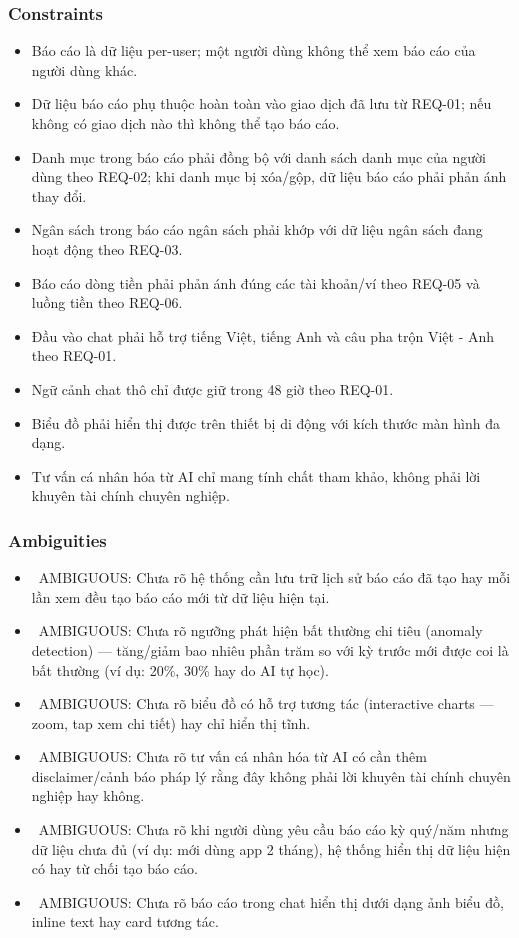 \subsubsection{Constraints}

\begin{itemize}
\item Báo cáo là dữ liệu per-user; một người dùng không thể xem báo cáo của người dùng khác.
\item Dữ liệu báo cáo phụ thuộc hoàn toàn vào giao dịch đã lưu từ REQ-01; nếu không có giao dịch nào thì không thể tạo báo cáo.
\item Danh mục trong báo cáo phải đồng bộ với danh sách danh mục của người dùng theo REQ-02; khi danh mục bị xóa/gộp, dữ liệu báo cáo phải phản ánh thay đổi.
\item Ngân sách trong báo cáo ngân sách phải khớp với dữ liệu ngân sách đang hoạt động theo REQ-03.
\item Báo cáo dòng tiền phải phản ánh đúng các tài khoản/ví theo REQ-05 và luồng tiền theo REQ-06.
\item Đầu vào chat phải hỗ trợ tiếng Việt, tiếng Anh và câu pha trộn Việt - Anh theo REQ-01.
\item Ngữ cảnh chat thô chỉ được giữ trong 48 giờ theo REQ-01.
\item Biểu đồ phải hiển thị được trên thiết bị di động với kích thước màn hình đa dạng.
\item Tư vấn cá nhân hóa từ AI chỉ mang tính chất tham khảo, không phải lời khuyên tài chính chuyên nghiệp.
\end{itemize}
\subsubsection{Ambiguities}

\begin{itemize}
\item \warningicon\  AMBIGUOUS: Chưa rõ hệ thống cần lưu trữ lịch sử báo cáo đã tạo hay mỗi lần xem đều tạo báo cáo mới từ dữ liệu hiện tại.
\item \warningicon\  AMBIGUOUS: Chưa rõ ngưỡng phát hiện bất thường chi tiêu (anomaly detection) — tăng/giảm bao nhiêu phần trăm so với kỳ trước mới được coi là bất thường (ví dụ: 20\%, 30\% hay do AI tự học).
\item \warningicon\  AMBIGUOUS: Chưa rõ biểu đồ có hỗ trợ tương tác (interactive charts — zoom, tap xem chi tiết) hay chỉ hiển thị tĩnh.
\item \warningicon\  AMBIGUOUS: Chưa rõ tư vấn cá nhân hóa từ AI có cần thêm disclaimer/cảnh báo pháp lý rằng đây không phải lời khuyên tài chính chuyên nghiệp hay không.
\item \warningicon\  AMBIGUOUS: Chưa rõ khi người dùng yêu cầu báo cáo kỳ quý/năm nhưng dữ liệu chưa đủ (ví dụ: mới dùng app 2 tháng), hệ thống hiển thị dữ liệu hiện có hay từ chối tạo báo cáo.
\item \warningicon\  AMBIGUOUS: Chưa rõ báo cáo trong chat hiển thị dưới dạng ảnh biểu đồ, inline text hay card tương tác.
\end{itemize}
